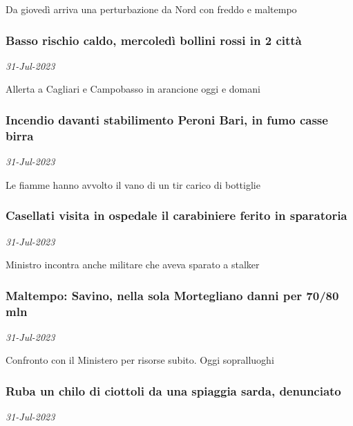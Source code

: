 Da gioved\`{i} arriva una perturbazione da Nord con freddo e maltempo
\subsubsection{Basso rischio caldo, mercoled\`{i} bollini rossi in 2 citt\`{a} \href{https://www.ansa.it/sito/notizie/cronaca/2023/07/31/basso-rischio-caldo-mercoledi-bollini-rossi-solo-in-2-citta_539b0148-0088-4569-a4c4-f916b60b1361.html}{}}
\textit{31-Jul-2023}

Allerta a Cagliari e Campobasso in arancione oggi e domani
\subsubsection{Incendio davanti stabilimento Peroni Bari, in fumo casse birra \href{https://www.ansa.it/sito/notizie/cronaca/2023/07/31/incendio-davanti-stabilimento-peroni-bari-in-fumo-casse-birra_14f90668-b3a1-4064-8f8f-e41d13986dc2.html}{}}
\textit{31-Jul-2023}

Le fiamme hanno avvolto il vano di un tir carico di bottiglie
\subsubsection{Casellati visita in ospedale il carabiniere ferito in sparatoria \href{https://www.ansa.it/sito/notizie/cronaca/2023/07/31/casellati-visita-in-ospedale-il-carabiniere-ferito-in-sparatoria_c055205b-6718-41cf-88e0-e1d63827de02.html}{}}
\textit{31-Jul-2023}

Ministro incontra anche militare che aveva sparato a stalker
\subsubsection{Maltempo: Savino, nella sola Mortegliano danni per 70/80 mln \href{https://www.ansa.it/sito/notizie/cronaca/2023/07/31/maltempo-savino-nella-sola-mortegliano-danni-per-70/80-mln_ab5f9117-9084-4ee4-9494-2b178e47eb45.html}{}}
\textit{31-Jul-2023}

Confronto con il Ministero per risorse subito. Oggi sopralluoghi
\subsubsection{Ruba un chilo di ciottoli da una spiaggia sarda, denunciato \href{https://www.ansa.it/sito/notizie/cronaca/2023/07/31/ruba-un-chilo-di-ciottoli-da-una-spiaggia-sarda-denunciato_fc99d5ba-ea3e-4812-a0e5-4af75ff9b907.html}{}}
\textit{31-Jul-2023}

